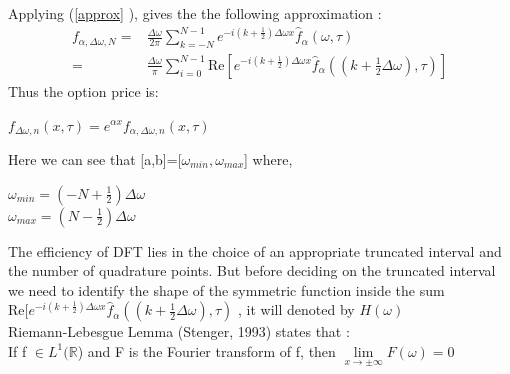 \documentclass[12pt]{report}
\begin{document}
Applying (\ref{approx} ), gives the the following approximation :
\begin{align}
f_{\alpha,\Delta \omega, N}=&\frac{\Delta \omega}{2\pi} \sum \limits_{k=-N}^{N-1} e^{-i(k+\frac{1}{2}) \Delta \omega x }\hat{f}_{\alpha}(\omega,\tau)
\\
=& \frac{\Delta \omega}{\pi} \sum \limits_{i=0}^{N-1} \text{Re}[e^{-i(k+\frac{1}{2}) \Delta \omega x }\hat{f}_{\alpha}((k+\frac{1}{2}\Delta\omega ),\tau)]
\label{fret}
\end{align} 
Thus the option price is: 
\begin{center}

$f_{\Delta \omega, n}(x,\tau)= e^{\alpha x}f_{\alpha,\Delta \omega, n}(x,\tau)$
\end{center}
 
 Here we can see that [a,b]=[$\omega_{min},\omega_{max}$]
 where,
\begin{center}
 $\omega_{min}=(-N+\frac{1}{2})\Delta \omega$\\
 $\omega_{max}=(N-\frac{1}{2})\Delta \omega$
\end{center}


The efficiency of DFT lies in the choice of an appropriate truncated interval and the number of quadrature points. But before deciding on the truncated interval we need to identify the shape of the symmetric function inside the sum $ \text{Re}[e^{-i(k+\frac{1}{2}) \Delta \omega x }\hat{f}_{\alpha}((k+\frac{1}{2}\Delta\omega ),\tau)$ , it will denoted by $H(\omega)$\\


Riemann-Lebesgue Lemma (Stenger, 1993) states that :\\ If f $\in L^1(\mathbb{R}$) and F is the Fourier transform of f, then  $\lim\limits_{x \rightarrow \pm \infty} F(\omega)=0$\\
\end{document}
